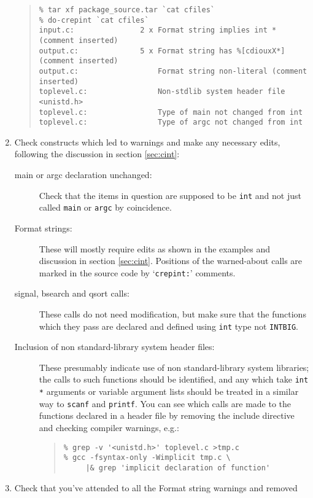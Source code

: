 \documentclass[twoside,11pt]{article}
\renewcommand{\_}{\texttt{\symbol{95}}}
\newcommand{\cc}[1]{{\tt #1}}
\newenvironment{squote}{\begin{quote}\begin{small}}{\end{small}\end{quote}}
\begin{document}
\begin{enumerate}
\begin{squote}
\begin{verbatim}
% tar xf package_source.tar `cat cfiles`
% do-crepint `cat cfiles`
input.c:               2 x Format string implies int * (comment inserted)
output.c:              5 x Format string has %[cdiouxX*] (comment inserted)  
output.c:                  Format string non-literal (comment inserted)
toplevel.c:                Non-stdlib system header file <unistd.h>    
toplevel.c:                Type of main not changed from int
toplevel.c:                Type of argc not changed from int
\end{verbatim}
\end{squote}
%
\item
Check constructs which led to warnings and make any necessary
edits, following the discussion in section \ref{sec:cint}:
\begin{description}
%
\item[main or argc declaration unchanged:]
Check that the items in question are supposed to be \cc{int} and not
just called \cc{main} or \cc{argc} by coincidence.
\item[Format strings:]
These will mostly require edits as shown in the examples
and discussion in section \ref{sec:cint}.
Positions of the warned-about calls are marked in the source code
by `\cc{crepint:}' comments.
%
\item[signal, bsearch and qsort calls:]
These calls do not need modification, but make sure that the functions 
which they pass are declared and defined 
using \cc{int} type not \cc{INT\_BIG}.
%
\item[Inclusion of non standard-library system header files:]
These presumably indicate use of non standard-library system libraries;
the calls to such functions should be identified, and any which take
\cc{int *} arguments or variable argument lists should be treated in
a similar way to \cc{scanf} and \cc{printf}.
You can see which calls are made to the functions declared in a header file
by removing the include directive and checking compiler warnings, e.g.:
\begin{squote}
\begin{verbatim}
% grep -v '<unistd.h>' toplevel.c >tmp.c
% gcc -fsyntax-only -Wimplicit tmp.c \
     |& grep 'implicit declaration of function'
\end{verbatim}
\end{squote}
\end{description}
%
\item
Check that you've attended to all the Format string warnings and removed

\end{enumerate}
\end{document}
